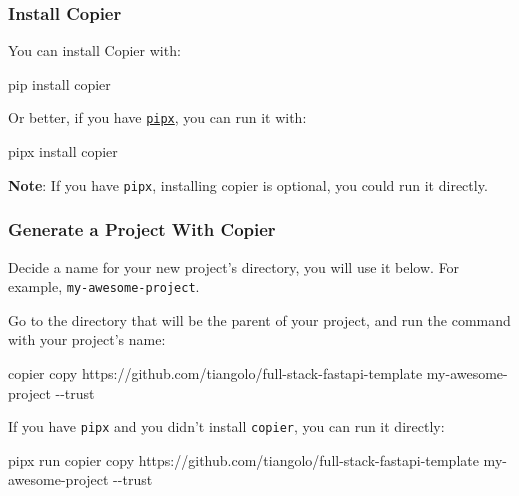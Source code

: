 \documentclass[
]{article}
\newenvironment{Shaded}{}{}
\newcommand{\AttributeTok}[1]{\textcolor[rgb]{0.49,0.56,0.16}{#1}}
\newcommand{\ExtensionTok}[1]{#1}
\newcommand{\NormalTok}[1]{#1}
\begin{document}
\hypertarget{install-copier}{%
\subsubsection{Install Copier}\label{install-copier}}

You can install Copier with:

\hypertarget{cb10}{}
\begin{Shaded}
\begin{Highlighting}[]
\ExtensionTok{pip}\NormalTok{ install copier}
\end{Highlighting}
\end{Shaded}

Or better, if you have \href{https://pipx.pypa.io/}{\texttt{pipx}}, you
can run it with:

\hypertarget{cb11}{}
\begin{Shaded}
\begin{Highlighting}[]
\ExtensionTok{pipx}\NormalTok{ install copier}
\end{Highlighting}
\end{Shaded}

\textbf{Note}: If you have \texttt{pipx}, installing copier is optional,
you could run it directly.

\hypertarget{generate-a-project-with-copier}{%
\subsubsection{Generate a Project With
Copier}\label{generate-a-project-with-copier}}

Decide a name for your new project's directory, you will use it below.
For example, \texttt{my-awesome-project}.

Go to the directory that will be the parent of your project, and run the
command with your project's name:

\hypertarget{cb12}{}
\begin{Shaded}
\begin{Highlighting}[]
\ExtensionTok{copier}\NormalTok{ copy https://github.com/tiangolo/full{-}stack{-}fastapi{-}template my{-}awesome{-}project }\AttributeTok{{-}{-}trust}
\end{Highlighting}
\end{Shaded}

If you have \texttt{pipx} and you didn't install \texttt{copier}, you
can run it directly:

\hypertarget{cb13}{}
\begin{Shaded}
\begin{Highlighting}[]
\ExtensionTok{pipx}\NormalTok{ run copier copy https://github.com/tiangolo/full{-}stack{-}fastapi{-}template my{-}awesome{-}project }\AttributeTok{{-}{-}trust}
\end{Highlighting}
\end{Shaded}
\end{document}
